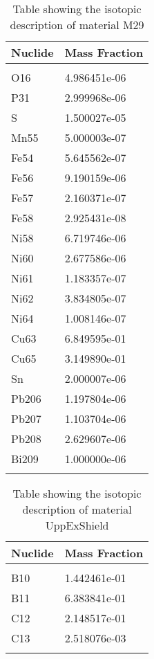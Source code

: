 \begin{centering}
\begin{longtable}[ht!]
\caption{Table showing the isotopic description of material EPPFW}
\label{table:material_EPPFW}
\end{longtable}\clearpage

\begin{longtable}[ht!]
{ p{} | p{} }
\hline
Nuclide & Mass Fraction\\
\hline
\\
O16 & 4.986451e-06\\
P31 & 2.999968e-06\\
S & 1.500027e-05\\
Mn55 & 5.000003e-07\\
Fe54 & 5.645562e-07\\
Fe56 & 9.190159e-06\\
Fe57 & 2.160371e-07\\
Fe58 & 2.925431e-08\\
Ni58 & 6.719746e-06\\
Ni60 & 2.677586e-06\\
Ni61 & 1.183357e-07\\
Ni62 & 3.834805e-07\\
Ni64 & 1.008146e-07\\
Cu63 & 6.849595e-01\\
Cu65 & 3.149890e-01\\
Sn & 2.000007e-06\\
Pb206 & 1.197804e-06\\
Pb207 & 1.103704e-06\\
Pb208 & 2.629607e-06\\
Bi209 & 1.000000e-06\\

\caption{Table showing the isotopic description of material M29}
\label{table:material_M29}
\end{longtable}\clearpage

\begin{longtable}[ht!]
{ p{} | p{} }
\hline
Nuclide & Mass Fraction\\
\hline
\\
B10 & 1.442461e-01\\
B11 & 6.383841e-01\\
C12 & 2.148517e-01\\
C13 & 2.518076e-03\\

\caption{Table showing the isotopic description of material UppExShield}
\label{table:material_UppExShield}
\end{longtable}\clearpage


\end{centering}
